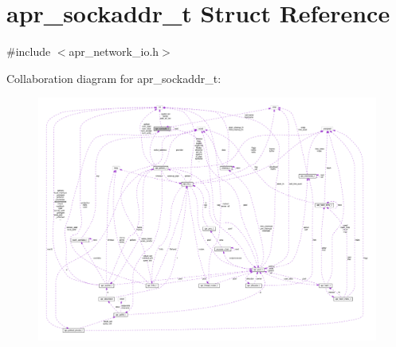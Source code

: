 \hypertarget{structapr__sockaddr__t}{}\section{apr\+\_\+sockaddr\+\_\+t Struct Reference}
\label{structapr__sockaddr__t}


{\ttfamily \#include $<$apr\+\_\+network\+\_\+io.\+h$>$}



Collaboration diagram for apr\+\_\+sockaddr\+\_\+t\+:
\nopagebreak
\begin{figure}[H]
\begin{center}
\leavevmode
\includegraphics[width=350pt]{structapr__sockaddr__t__coll__graph}
\end{center}
\end{figure}
